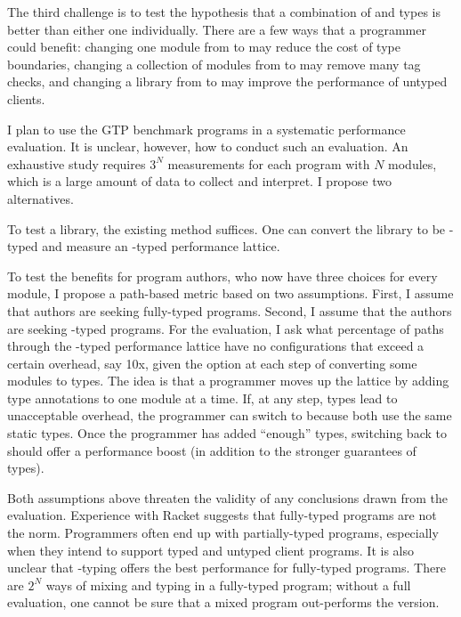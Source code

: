 The third challenge is to test the hypothesis that a combination of \tdeep{}
 and \tshallow{} types is better than either one individually.
There are a few ways that a programmer could benefit:
 changing one module from \tdeep{} to \tshallow{} may reduce the cost of type boundaries,
 changing a collection of modules from \tshallow{} to \tdeep{} may remove many tag checks,
 and changing a library from \tdeep{} to \tshallow{} may improve the performance of untyped clients.

I plan to use the GTP benchmark programs in a systematic performance evaluation.
It is unclear, however, how to conduct such an evaluation.
An exhaustive study requires $3^N$ measurements for each program with $N$
 modules, which is a large amount of data to collect and interpret.
I propose two alternatives.

To test a library, the existing method suffices.
One can convert the library to be \tshallow{}-typed and measure an
 \tdeep{}-typed performance lattice.

To test the benefits for program authors, who now have three choices for every
module, I propose a path-based metric based on two assumptions.
First, I assume that authors are seeking fully-typed programs.
Second, I assume that the authors are seeking \tdeep{}-typed programs.
For the evaluation, I ask what percentage of paths through the \tdeep{}-typed performance
 lattice have no configurations that exceed a certain overhead, say 10x, given
 the option at each step of converting some modules to \tshallow{} types.
The idea is that a programmer moves up the lattice by adding type annotations
 to one module at a time.
If, at any step, \tdeep{} types lead to unacceptable overhead, the programmer can
 switch to \tshallow{} because both use the same static types.
Once the programmer has added ``enough'' types, switching back to \tdeep{} should
offer a performance boost (in addition to the stronger guarantees of \tdeep{} types).

Both assumptions above threaten the validity of any conclusions drawn from the
evaluation.
Experience with Racket suggests that fully-typed programs are not the norm.
Programmers often end up with partially-typed programs, especially when they
intend to support typed and untyped client programs.
It is also unclear that \tdeep{}-typing offers the best performance for fully-typed
programs.
There are $2^N$ ways of mixing \tdeep{} and \tshallow{} typing in a fully-typed program;
 without a full evaluation, one cannot be sure that a mixed program out-performs
 the \tdeep{} version.

